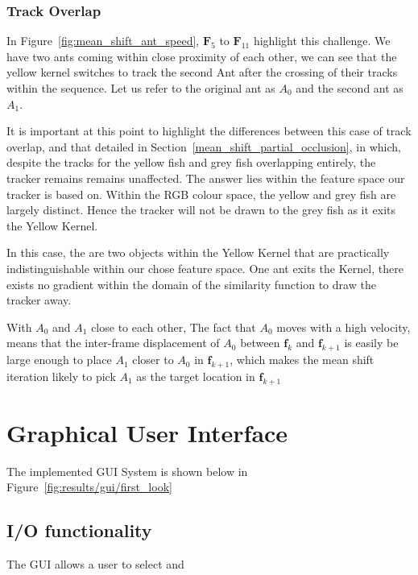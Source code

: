 \subsubsection{Track Overlap}\label{mean_shift_track_overlap}
In Figure~\ref{fig:mean_shift_ant_speed}, $\mathbf{F}_5$ to $\mathbf{F}_{11}$
highlight this challenge. We have two ants coming within close proximity of
each other, we can see that the yellow kernel switches to track the second Ant
after the crossing of their tracks within the sequence. Let us refer to the
original ant as $A_0$ and the second ant as $A_1$. 

It is important at this point to highlight the differences between this case of
track overlap, and that detailed in Section~\ref{mean_shift_partial_occlusion},
in which, despite the tracks for the yellow fish and grey fish overlapping
entirely, the tracker remains remains unaffected.
The answer lies within the feature space our tracker is based on. Within the RGB colour space,
the yellow and grey fish are largely distinct. Hence the tracker will not be
drawn to the grey fish as it exits the Yellow Kernel.

In this case, the are two objects within the Yellow Kernel that are practically
indistinguishable within our chose feature space. One ant exits the Kernel, there exists
no gradient within the domain of the similarity function to draw the tracker away.

With $A_0$ and $A_1$ close to each other, The fact that $A_0$ moves with a high
velocity, means that the inter-frame displacement of $A_0$ between
$\mathbf{f}_k$ and $\mathbf{f}_{k+1}$ is easily be large enough to place $A_1$
closer to $A_0$ in $\mathbf{f}_{k+1}$, which makes the mean shift iteration
likely to pick $A_1$ as the target location in $\mathbf{f}_{k+1}$

\section{Graphical User Interface}
The implemented GUI System is shown below in Figure~\ref{fig:results/gui/first_look}


\subsection{I/O functionality}
The GUI allows a user to select and 

